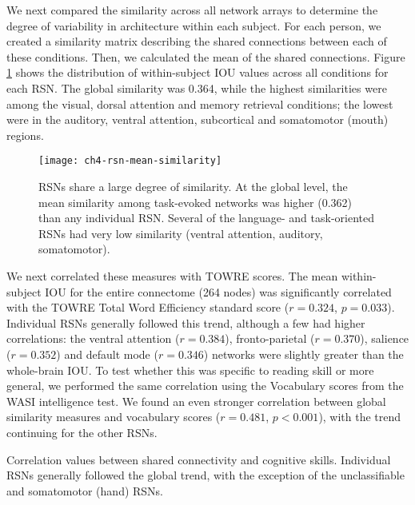 We next compared the similarity across all network arrays to determine the degree of variability in architecture within each subject. For each person, we created a similarity matrix describing the shared connections between each of these conditions. Then, we calculated the mean of the shared connections. Figure \ref{fig:ch4-rsn-mean-similarity} shows the distribution of within-subject IOU values across all conditions for each RSN. The global similarity was 0.364, while the highest similarities were among the visual, dorsal attention and memory retrieval conditions; the lowest were in the auditory, ventral attention, subcortical and somatomotor (mouth) regions.

\begin{figure}[t]
	\centering
	\texttt{[image: ch4-rsn-mean-similarity]}
    \caption[RSNs share a large degree of similarity.]{RSNs share a large degree of similarity. At the global level, the mean similarity among task-evoked networks was higher (0.362) than any individual RSN. Several of the language- and task-oriented RSNs had very low similarity (ventral attention, auditory, somatomotor).}
	\label{fig:ch4-rsn-mean-similarity}
\end{figure}

We next correlated these measures with TOWRE scores. The mean within-subject IOU for the entire connectome (264 nodes) was significantly correlated with the TOWRE Total Word Efficiency standard score ($r = 0.324$, $p = 0.033$). Individual RSNs generally followed this trend, although a few had higher correlations: the ventral attention ($r=0.384$), fronto-parietal ($r=0.370$), salience ($r=0.352$) and default mode ($r=0.346$) networks were slightly greater than the whole-brain IOU. To test whether this was specific to reading skill or more general, we performed the same correlation using the Vocabulary scores from the WASI intelligence test. We found an even stronger correlation between global similarity measures and vocabulary scores ($r = 0.481$, $p < 0.001$), with the trend continuing for the other RSNs. 

\begin{table}[t]
	\renewcommand{\tabcolsep}{0.09cm}
	\centering
	
	\caption[Correlation values between shared connectivity and cognitive skill.]{Correlation values between shared connectivity and cognitive skills. Individual RSNs generally followed the global trend, with the exception of the unclassifiable and somatomotor (hand) RSNs.}
	\label{table:ch4-rsn-similarity-to-reading}
\end{table}

